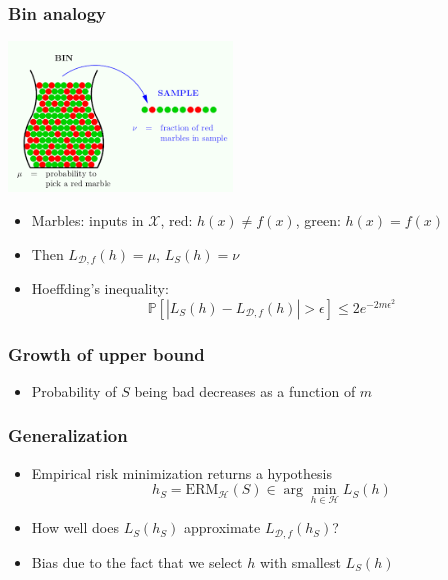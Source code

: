 \documentclass[10pt]{beamer}
\begin{document}
\begin{frame}
  \frametitle{Bin analogy}
  \begin{center}
	\includegraphics[height=4cm]{images/bins.png}
  \end{center}
  \begin{itemize}
	\item Marbles: inputs in $\mathcal{X}$, {\color{red} red}: $h(x)\neq f(x)$, {\color{green} green}: $h(x)=f(x)$ 
	\item Then $L_{\mathcal{D},f}(h)=\mu$, $L_S(h)=\nu$
	\item Hoeffding's inequality:
	\[
	\mathbb{P}\left[|L_S(h) - L_{\mathcal{D},f}(h)| > \epsilon\right] \leq 2 e^{-2m\epsilon^2}
	\]
  \end{itemize}
\end{frame}

\begin{frame}
  \frametitle{Growth of upper bound}
  \begin{center}
  \end{center}
  \begin{itemize}
	\item Probability of $S$ being {\color{red} bad} decreases as a function of $m$
  \end{itemize}
\end{frame}

\begin{frame}
  \frametitle{Generalization}
  \begin{itemize}
	\item Empirical risk minimization returns a hypothesis
	\[
	h_S=\mathrm{ERM}_\mathcal{H}(S) \in \arg\min_{h\in\mathcal{H}}L_S(h)
	\]
	\item How well does $L_S(h_S)$ approximate $L_{\mathcal{D},f}(h_S)$?
	\item {\color{red} Bias} due to the fact that we select $h$ with {\color{blue} smallest $L_S(h)$}
  \end{itemize}
\end{frame}
\end{document}
